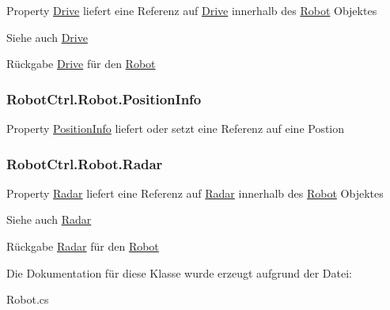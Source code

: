 \label{class_robot_ctrl_1_1_robot_a6e1e59f43f8578d78da6c6a19e55f269}
Property \hyperlink{class_robot_ctrl_1_1_drive}{Drive} liefert eine Referenz auf \hyperlink{class_robot_ctrl_1_1_drive}{Drive} innerhalb des \hyperlink{class_robot_ctrl_1_1_robot}{Robot} Objektes \begin{DoxySeeAlso}{Siehe auch}
\hyperlink{class_robot_ctrl_1_1_drive}{Drive}
\end{DoxySeeAlso}
\begin{DoxyReturn}{Rückgabe}
\hyperlink{class_robot_ctrl_1_1_drive}{Drive} f\"{u}r den \hyperlink{class_robot_ctrl_1_1_robot}{Robot} 
\end{DoxyReturn}
\hypertarget{class_robot_ctrl_1_1_robot_abf06b5671ccaf469cc251723ec811002}{
\subsubsection[{PositionInfo}]{ RobotCtrl.Robot.PositionInfo}}
\label{class_robot_ctrl_1_1_robot_abf06b5671ccaf469cc251723ec811002}
Property \hyperlink{struct_robot_ctrl_1_1_position_info}{PositionInfo} liefert oder setzt eine Referenz auf eine Postion \hypertarget{class_robot_ctrl_1_1_robot_adcc563b2531e72dcdfb9af5cafda1cbc}{
\subsubsection[{Radar}]{ RobotCtrl.Robot.Radar}}
\label{class_robot_ctrl_1_1_robot_adcc563b2531e72dcdfb9af5cafda1cbc}
Property \hyperlink{class_robot_ctrl_1_1_radar}{Radar} liefert eine Referenz auf \hyperlink{class_robot_ctrl_1_1_radar}{Radar} innerhalb des \hyperlink{class_robot_ctrl_1_1_robot}{Robot} Objektes \begin{DoxySeeAlso}{Siehe auch}
\hyperlink{class_robot_ctrl_1_1_radar}{Radar}
\end{DoxySeeAlso}
\begin{DoxyReturn}{Rückgabe}
\hyperlink{class_robot_ctrl_1_1_radar}{Radar} f\"{u}r den \hyperlink{class_robot_ctrl_1_1_robot}{Robot} 
\end{DoxyReturn}


Die Dokumentation für diese Klasse wurde erzeugt aufgrund der Datei:\begin{DoxyCompactItemize}
\item 
Robot.cs\end{DoxyCompactItemize}
